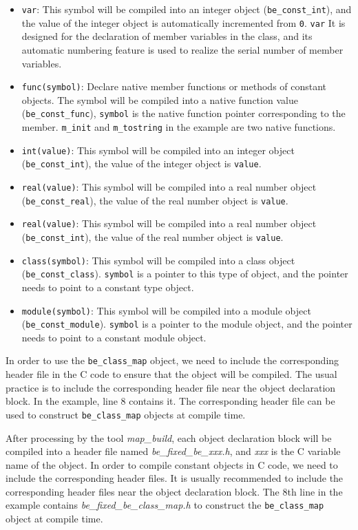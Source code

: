 \begin{itemize}
    \item \texttt{var}: This symbol will be compiled into an integer object (\texttt{be\_const\_int}), and the value of the integer object is automatically incremented from \texttt{0}. \texttt{var} It is designed for the declaration of member variables in the class, and its automatic numbering feature is used to realize the serial number of member variables.
    \item \texttt{func(symbol)}: Declare native member functions or methods of constant objects. The symbol will be compiled into a native function value (\texttt{be\_const\_func}), \texttt{symbol} is the native function pointer corresponding to the member. \texttt{m\_init} and \texttt{m\_tostring} in the example are two native functions.
    \item \texttt{int(value)}: This symbol will be compiled into an integer object (\texttt{be\_const\_int}), the value of the integer object is \texttt{value}.
    \item \texttt{real(value)}: This symbol will be compiled into a real number object (\texttt{be\_const\_real}), the value of the real number object is \texttt{value}.
    \item \texttt{real(value)}: This symbol will be compiled into a real number object (\texttt{be\_const\_int}), the value of the real number object is \texttt{value}.
    \item \texttt{class(symbol)}: This symbol will be compiled into a class object (\texttt{be\_const\_class}). \texttt{symbol} is a pointer to this type of object, and the pointer needs to point to a constant type object.
    \item \texttt{module(symbol)}: This symbol will be compiled into a module object (\texttt{be\_const\_module}). \texttt{symbol} is a pointer to the module object, and the pointer needs to point to a constant module object.
\end{itemize}

In order to use the \texttt{be\_class\_map} object, we need to include the corresponding header file in the C code to ensure that the object will be compiled. The usual practice is to include the corresponding header file near the object declaration block. In the example, line 8 contains it. The corresponding header file can be used to construct \texttt{be\_class\_map} objects at compile time.

After processing by the tool \textsl{map\_build}, each object declaration block will be compiled into a header file named \textsl{be\_fixed\_be\_xxx.h}, and \textsl{xxx} is the C variable name of the object. In order to compile constant objects in C code, we need to include the corresponding header files. It is usually recommended to include the corresponding header files near the object declaration block. The 8th line in the example contains \textsl{be\_fixed\_be\_class\_map.h} to construct the \texttt{be\_class\_map} object at compile time.

